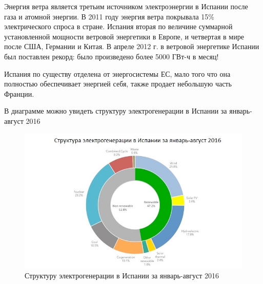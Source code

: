 Энергия ветра является третьим источником электроэнергии в Испании после газа и атомной энергии. В 2011 году энергия ветра покрывала 15\% электрического спроса в стране. Испания вторая по величине суммарной установленной мощности ветровой энергетики в Европе, и четвертая в мире после США, Германии и Китая.
В апреле 2012 г. в ветровой энергетике Испании был поставлен рекорд: было произведено более 5000 ГВт-ч в месяц!

Испания по существу отделена от энергосистемы ЕС, мало того что она полностью обеспечивает энергией себя, также продает небольшую часть Франции.

В диаграмме  можно увидеть структуру электрогенерации в Испании за январь-август 2016

\begin{figure}[h]
	\begin{center}
		\includegraphics[width=.5\columnwidth]{./img/Spain-energy.jpg}
	\end{center}
	\caption{Структуру электрогенерации в Испании за январь-август 2016}
	\label{pic:struct_energy}
\end{figure}








